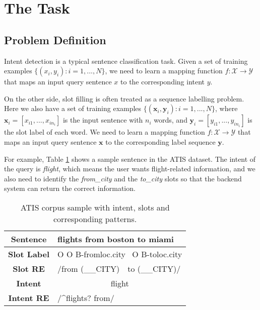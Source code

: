 \section{The Task}
\subsection{Problem Definition}
Intent detection is a typical sentence classification task. Given a set of training examples $\{(x_i, y_i): i=1,...,N\}$, we need to learn a mapping function $f: \mathcal{X} \rightarrow \mathcal{Y}$ that maps an input query sentence $x$ to the corresponding intent $y$.

On the other side, slot filling is often treated as a sequence labelling problem. Here we also have a set of training examples $\{(\textbf{x}_i, \textbf{y}_i): i=1,...,N\}$, where $\textbf{x}_i=[x_{i1}, ..., x_{in_i}]$ is the input sentence with $n_i$ words, and $\textbf{y}_i=[y_{i1}, ..., y_{in_i}]$ is the slot label of each word. We need to learn a mapping function $f: \mathcal{X} \rightarrow \mathcal{Y}$ that maps an input query sentence $\textbf{x}$ to the corresponding label sequence $\textbf{y}$.

For example, Table \ref{atis_sample} shows a sample sentence in the ATIS dataset. The intent of the query is \emph{flight}, which means the user wants flight-related information, and we also need to identify the \emph{from\_city} and the \emph{to\_city} slots so that the backend system can return the correct information.

\begin{table}
\setlength{\tabcolsep}{0.23em}
\centering
\small{
\begin{tabular}{|c|l|}

\hline
\textbf{Sentence} &flights \;\;\; from \;\;\;\;\; boston \;\;\;\;\;\;\; to \;\;\;\; miami  \\
\hline
\textbf{Slot Label} &\;\;\; O \;\;\;\;\;\;\;\; O \;\; B-fromloc.city \, O \; B-toloc.city \\
\hline
\textbf{Slot RE} & \multicolumn{1}{|l|}{\quad\quad\quad\;\;/from \quad (\_\_CITY) \;\;\;\;\,\, to \quad (\_\_CITY)/} \\
\hline
\textbf{Intent} &\multicolumn{1}{|c|}{flight} \\
\hline
\textbf{Intent RE} & \multicolumn{1}{|l|}{/\textasciicircum flights? from/} \\
\hline
\end{tabular}
}
\caption{ATIS corpus sample with intent, slots and corresponding \RE patterns.}
\label{atis_sample}
\end{table}


